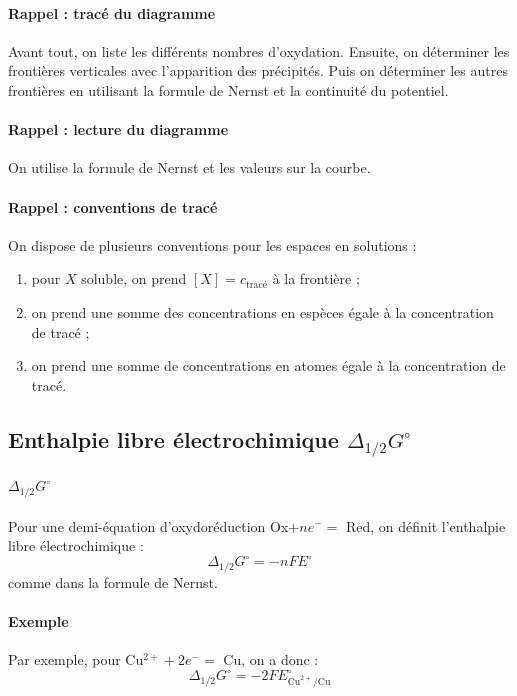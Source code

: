 \documentclass[french]{book}
\theoremstyle{plain}
\theoremstyle{definition}
\theoremstyle{remark}
\begin{document}
\paragraph{Rappel : tracé du diagramme} Avant tout, on liste les différents nombres d'oxydation. Ensuite, on déterminer les frontières verticales avec l'apparition des précipités. Puis on déterminer les autres frontières en utilisant la formule de Nernst et la continuité du potentiel.

\paragraph{Rappel : lecture du diagramme} On utilise la formule de Nernst et les valeurs sur la courbe.

\paragraph{Rappel : conventions de tracé} On dispose de plusieurs conventions pour les espaces en solutions : 
\begin{enumerate}
	\item pour $X$ soluble, on prend $[X]=c_{\text{tracé}}$ à la frontière ;
	\item on prend une somme des concentrations en espèces égale à la concentration de tracé ;
	\item on prend une somme de concentrations en atomes égale à la concentration de tracé.
\end{enumerate}

\subsection{Enthalpie libre électrochimique $\Delta_{1/2}G^\circ$}

\paragraph{$\Delta_{1/2}G^\circ$} Pour une demi-équation d'oxydoréduction Ox$+ne^-=$ Red, on définit l'enthalpie libre électrochimique : $$\Delta_{1/2}G^\circ=-nFE^\circ$$ comme dans la formule de Nernst.

\paragraph{Exemple} Par exemple, pour Cu$^{2+}+2e^-=$ Cu, on a donc : $$\Delta_{1/2}G^\circ=-2FE_{\text{Cu}^{2+}/\text{Cu}}^\circ$$
\end{document}
